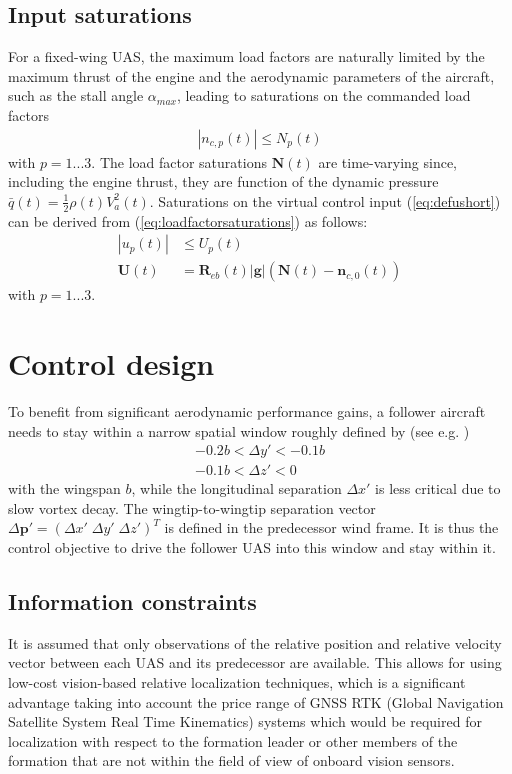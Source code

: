 \documentclass{ifacconf}
\providecommand{\mbf}[1]{\mathbf{#1}}
\newcommand{\idxAxis}{{\ensuremath{p}}}
\begin{document}
\subsection{Input saturations}
For a fixed-wing UAS, the maximum load factors are naturally limited by the maximum thrust of the engine and the aerodynamic parameters of the aircraft, such as the stall angle $\alpha_{max}$, leading to saturations on the commanded load factors
\begin{align}
|{n}_{c, \idxAxis}(t)| \leq {N}_\idxAxis(t)
\label{eq:loadfactorsaturations}
\end{align}
with $\idxAxis = 1...3$. The load factor saturations $\mbf{N}(t)$ are time-varying since, including the engine thrust, they are function of the dynamic pressure $\bar{q}(t) = \frac{1}{2}\rho(t) V_a^2(t)$.
Saturations on the virtual control input (\ref{eq:defushort}) can be derived from (\ref{eq:loadfactorsaturations}) as follows:
\begin{align}
|{u}_\idxAxis(t)| &\leq {U}_\idxAxis(t) \\
\mbf{U}(t) &= \mbf{R}_{eb}(t) |\mbf{g}|(\mbf{N}(t)-\mbf{n}_{c,0}(t))
\label{eq:saturationsonU}
\end{align}
with $\idxAxis = 1...3$.
\section{Control design}
\label{sec:controldesign}
To benefit from significant aerodynamic performance gains, a follower aircraft needs to stay within a narrow spatial window roughly defined by (see e.g. \cite{jake2003f})
\begin{align}
-0.2 b < \Delta y' < -0.1 b \\
-0.1 b < \Delta z' < 0 
\label{eq:windowz}
\end{align}
with the wingspan $b$, while the longitudinal separation $\Delta x'$ is less critical due to slow vortex decay. The wingtip-to-wingtip separation vector $\Delta \mbf{p'} = ( \Delta x' \; \Delta y' \; \Delta z')^T$ is defined in the predecessor wind frame.
It is thus the control objective to drive the follower UAS into this window and stay within it.
\subsection{Information constraints}
It is assumed that only observations of the relative position and relative velocity vector between each UAS and its predecessor are available.
This allows for using low-cost vision-based relative localization techniques, which is a significant advantage taking into account the price range of GNSS RTK (Global Navigation Satellite System Real Time Kinematics) systems which would be required for localization with respect to the formation leader or other members of the formation that are not within the field of view of onboard vision sensors.
\end{document}
